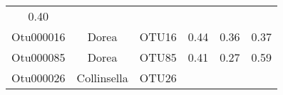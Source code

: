 \documentclass[12pt,]{article}
\begin{document}
\begin{longtable}[]{@{}cccccc@{}}
\begin{minipage}[t]{0.04\columnwidth}
0.40\strut
\end{minipage}\tabularnewline
\begin{minipage}[t]{0.08\columnwidth}\centering\strut
Otu000016\strut
\end{minipage} & \begin{minipage}[t]{0.17\columnwidth}\centering\strut
Dorea\strut
\end{minipage} & \begin{minipage}[t]{0.15\columnwidth}\centering\strut
OTU16\strut
\end{minipage} & \begin{minipage}[t]{0.22\columnwidth}\centering\strut
0.44\strut
\end{minipage} & \begin{minipage}[t]{0.17\columnwidth}\centering\strut
0.36\strut
\end{minipage} & \begin{minipage}[t]{0.04\columnwidth}\centering\strut
0.37\strut
\end{minipage}\tabularnewline
\begin{minipage}[t]{0.08\columnwidth}\centering\strut
Otu000085\strut
\end{minipage} & \begin{minipage}[t]{0.17\columnwidth}\centering\strut
Dorea\strut
\end{minipage} & \begin{minipage}[t]{0.15\columnwidth}\centering\strut
OTU85\strut
\end{minipage} & \begin{minipage}[t]{0.22\columnwidth}\centering\strut
0.41\strut
\end{minipage} & \begin{minipage}[t]{0.17\columnwidth}\centering\strut
0.27\strut
\end{minipage} & \begin{minipage}[t]{0.04\columnwidth}\centering\strut
0.59\strut
\end{minipage}\tabularnewline
\begin{minipage}[t]{0.08\columnwidth}\centering\strut
Otu000026\strut
\end{minipage} & \begin{minipage}[t]{0.17\columnwidth}\centering\strut
Collinsella\strut
\end{minipage} & \begin{minipage}[t]{0.15\columnwidth}\centering\strut
OTU26\strut
\end{minipage} & \begin{minipage}[t]{0.22\columnwidth}\centering\strut

\end{minipage}
\end{longtable}
\end{document}
